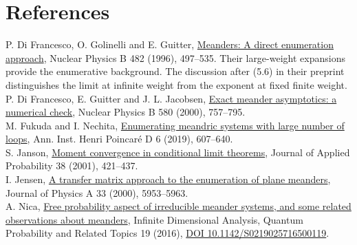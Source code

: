 \documentclass[11pt,letterpaper]{article}
\begin{document}
\section*{References}\small
\noindent
P. Di Francesco, O. Golinelli and E. Guitter,
\href{https://arxiv.org/abs/hep-th/9607039}{Meanders: A direct
enumeration approach}, Nuclear Physics B 482 (1996), 497--535.
Their large-weight expansions provide the enumerative background. The discussion after (5.6) in their preprint distinguishes the limit at infinite weight from the exponent at fixed finite weight.\\[4pt]
P. Di Francesco, E. Guitter and J. L. Jacobsen,
\href{https://arxiv.org/abs/cond-mat/0003008}{Exact meander
asymptotics: a numerical check}, Nuclear Physics B 580 (2000), 757--795.\\[4pt]
M. Fukuda and I. Nechita,
\href{https://arxiv.org/abs/1609.02756}{Enumerating meandric systems
with large number of loops}, Ann. Inst. Henri Poincar\'e D 6
(2019), 607--640.\\[4pt]
S. Janson, \href{https://doi.org/10.1239/jap/996986753}{Moment
convergence in conditional limit theorems}, Journal of Applied Probability
38 (2001), 421--437.\\[4pt]
I. Jensen, \href{https://arxiv.org/abs/cond-mat/0008178}{A transfer
matrix approach to the enumeration of plane meanders}, Journal of
Physics A 33 (2000), 5953--5963.\\[4pt]
A. Nica, \href{https://arxiv.org/abs/1506.01345}{Free probability
aspect of irreducible meander systems, and some related observations
about meanders}, Infinite Dimensional Analysis, Quantum Probability
and Related Topics 19 (2016), \href{https://doi.org/10.1142/S0219025716500119}{DOI 10.1142/S0219025716500119}.
\end{document}

